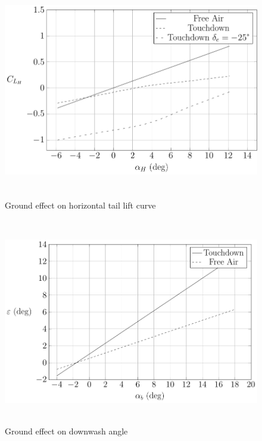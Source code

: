 \begin{figure}[H]
	\includegraphics[height=9.5cm, keepaspectratio ]{Immagini/Capitolo3/3_2-GroundEffectOnHorizontalTailLiftCurve} 
	\caption{Ground effect on horizontal tail lift curve} %
	\label{fig:figura3_2} %
\end{figure}

\begin{figure}[H]
	\includegraphics[height=9cm, keepaspectratio ]{Immagini/Capitolo3/3_3-GroundEffectOnDownwashAngle} 
	\caption{Ground effect on downwash angle} %
	\label{fig:figura3_3} %
\end{figure}

